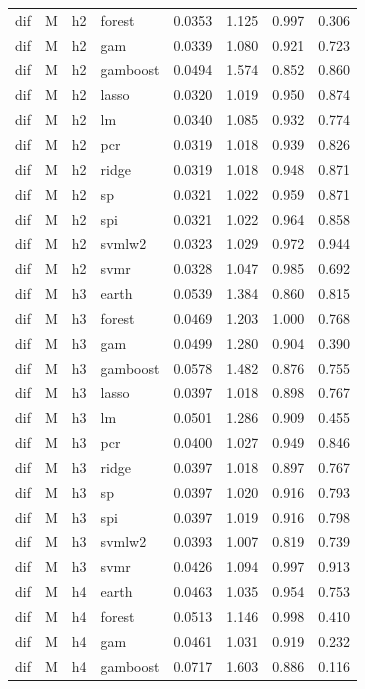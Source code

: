 \begin{ThreePartTable}
\begin{longtable}[t]{llclcccc}
dif & M & h2 & forest & 0.0353 & 1.125 & 0.997 & 0.306\\
dif & M & h2 & gam & 0.0339 & 1.080 & 0.921 & 0.723\\
dif & M & h2 & gamboost & 0.0494 & 1.574 & 0.852 & 0.860\\
dif & M & h2 & lasso & 0.0320 & 1.019 & 0.950 & 0.874\\
dif & M & h2 & lm & 0.0340 & 1.085 & 0.932 & 0.774\\
dif & M & h2 & pcr & 0.0319 & 1.018 & 0.939 & 0.826\\
dif & M & h2 & ridge & 0.0319 & 1.018 & 0.948 & 0.871\\
dif & M & h2 & sp & 0.0321 & 1.022 & 0.959 & 0.871\\
dif & M & h2 & spi & 0.0321 & 1.022 & 0.964 & 0.858\\
dif & M & h2 & svmlw2 & 0.0323 & 1.029 & 0.972 & 0.944\\
dif & M & h2 & svmr & 0.0328 & 1.047 & 0.985 & 0.692\\
\addlinespace
dif & M & h3 & earth & 0.0539 & 1.384 & 0.860 & 0.815\\
dif & M & h3 & forest & 0.0469 & 1.203 & 1.000 & 0.768\\
dif & M & h3 & gam & 0.0499 & 1.280 & 0.904 & 0.390\\
dif & M & h3 & gamboost & 0.0578 & 1.482 & 0.876 & 0.755\\
dif & M & h3 & lasso & 0.0397 & 1.018 & 0.898 & 0.767\\
dif & M & h3 & lm & 0.0501 & 1.286 & 0.909 & 0.455\\
dif & M & h3 & pcr & 0.0400 & 1.027 & 0.949 & 0.846\\
dif & M & h3 & ridge & 0.0397 & 1.018 & 0.897 & 0.767\\
dif & M & h3 & sp & 0.0397 & 1.020 & 0.916 & 0.793\\
dif & M & h3 & spi & 0.0397 & 1.019 & 0.916 & 0.798\\
dif & M & h3 & svmlw2 & 0.0393 & 1.007 & 0.819 & 0.739\\
dif & M & h3 & svmr & 0.0426 & 1.094 & 0.997 & 0.913\\
\addlinespace
dif & M & h4 & earth & 0.0463 & 1.035 & 0.954 & 0.753\\
dif & M & h4 & forest & 0.0513 & 1.146 & 0.998 & 0.410\\
dif & M & h4 & gam & 0.0461 & 1.031 & 0.919 & 0.232\\
dif & M & h4 & gamboost & 0.0717 & 1.603 & 0.886 & 0.116\\

\end{longtable}
\end{ThreePartTable}
